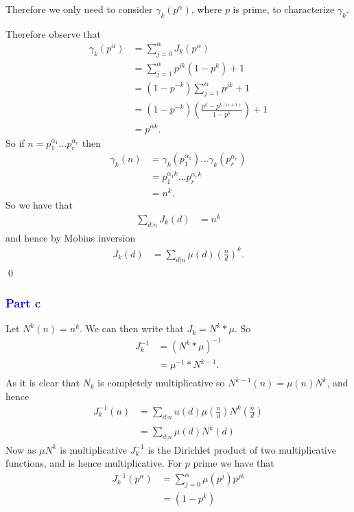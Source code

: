 \documentclass{unswmaths}
\begin{document}
Therefore we only need to consider $ \gamma_k(p^\alpha) $, where $ p $ is prime,
to characterize $ \gamma_k $.

Therefore observe that
\begin{align*}
    \gamma_k(p^\alpha) &= \sum_{j = 0}^\alpha J_k(p^\alpha) \\
        &= \sum_{j = 1}^\alpha p^{jk}(1-p^k) + 1 \\
        &= (1-p^{-k}) \sum_{j=1}^\alpha p^{jk} + 1 \\
        &= ( 1 - p^{-k})\left( \frac{p^k - p^{k(\alpha + 1)}}{1 - p^k} \right) + 1 \\
        &= p^{\alpha k}.
\end{align*}
So if $ n = p_1^{\alpha_1} \ldots p_r^{\alpha_r} $ then
\begin{align*}
    \gamma_k(n) &= \gamma_k(p_1^{\alpha_1}) \ldots \gamma_k(p_r^{\alpha_r}) \\
        &= p_1^{\alpha_1 k} \ldots p_r^{\alpha_r k} \\
        &= n^k.
\end{align*}
So we have that
\begin{align*}
    \sum_{d|n} J_k(d) &= n^k
\end{align*}
and hence by Mobius inversion
\begin{align*}
    J_k(d) &= \sum_{d|n} \mu(d) \left(\frac{n}{d}\right)^k.
\end{align*}
\qed
\subsubsection*{\textcolor{blue}{Part c}}

Let $ N^k(n) = n^k $. We can then write that $ J_k =  N^k * \mu $. 
So
\begin{align*}
	J_k^{-1} &= (N^k * \mu )^{-1} \\
	&= \mu^{-1} * N^{k -1}. \\
\end{align*}
As it is clear that $ N_k $ is completely multiplicative so $ N^{k -1}(n) = \mu(n)N^{k} $,
and hence 
\begin{align*}
	J_k^{-1}(n) &= \sum_{d|n} u(d) \mu\left( \frac{n}{d} \right) N^{k}\left( \frac{n}{d} \right) \\
		&= \sum_{d|n} \mu(d) N^{k}(d)
\end{align*}
Now as $ \mu N^{k} $ is multiplicative $ J_k^{-1} $ is the Dirichlet product of two multiplicative functions,
and is hence multiplicative.
For $ p $ prime we have that
\begin{align*}
	J_k^{-1}(p^\alpha) &= \sum_{j=0}^{\alpha}\mu(p^j)p^{jk} \\
		&= (1 - p^k)
\end{align*}
\end{document}
